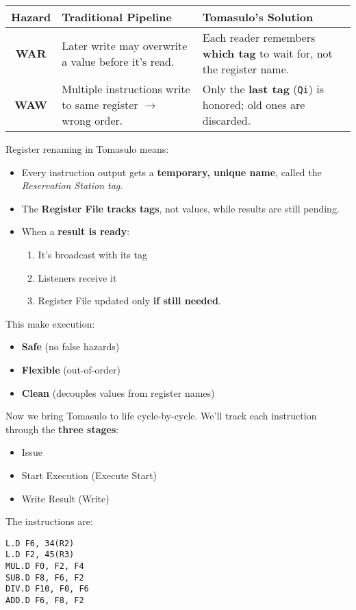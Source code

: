 \begin{examplebox}
\begin{center}
\begin{adjustbox}{width={\textwidth},totalheight={\textheight},keepaspectratio}
\begin{tabular}{@{} c | p{13.5em} | p{13.5em} @{}}
                \toprule
                Hazard & Traditional Pipeline & Tomasulo's Solution \\
                \midrule
                \textbf{WAR} & Later write may overwrite a value before it's read.                      & Each reader remembers \textbf{which tag} to wait for, not the register name.  \\ [.5em]
                \textbf{WAW} & Multiple instructions write to same register $\rightarrow$ wrong order.  & Only the \textbf{last tag} (\texttt{Qi}) is honored; old ones are discarded.  \\
                \bottomrule
            \end{tabular}
        \end{adjustbox}
    \end{center}

    \noindent
    Register renaming in Tomasulo means:
    \begin{itemize}
        \item Every instruction output gets a \textbf{temporary, unique name}, called the \emph{Reservation Station tag}.
        \item The \textbf{Register File tracks tags}, not values, while results are still pending.
        \item When a \textbf{result is ready}:
        \begin{enumerate}
            \item It's broadcast with its tag
            \item Listeners receive it
            \item Register File updated only \textbf{if still needed}.
        \end{enumerate}
    \end{itemize}
    This make execution:
    \begin{itemize}
        \item \textbf{Safe} (no false hazards)
        \item \textbf{Flexible} (out-of-order)
        \item \textbf{Clean} (decouples values from register names)
    \end{itemize}
\end{examplebox}

\newpage

\noindent
Now we bring Tomasulo to life cycle-by-cycle. We'll track each instruction through the \textbf{three stages}:
\begin{itemize}
    \item Issue
    \item Start Execution (Execute Start)
    \item Write Result (Write)
\end{itemize}
The instructions are:
\begin{lstlisting}[language=unknown]
L.D F6, 34(R2)
L.D F2, 45(R3)
MUL.D F0, F2, F4
SUB.D F8, F6, F2
DIV.D F10, F0, F6
ADD.D F6, F8, F2\end{lstlisting}

